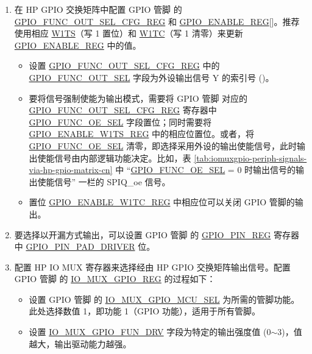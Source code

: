 \documentclass[main\_\_CN.tex]{subfiles}
\begin{document}
\begin{enumerate}
    \item 在 HP GPIO 交换矩阵中配置 GPIO 管脚  的 \hyperref[regdesc:GPIOFUNCNOUTSELCFGREG]{GPIO\_FUNC\_OUT\_SEL\_CFG\_REG} 和 \hyperref[regdesc:GPIOENABLEREG]{GPIO\_ENABLE\_REG}[]。推荐使用相应 \hyperref[regdesc:GPIOENABLEW1TSREG]{W1TS}（写 1 置位）和 \hyperref[regdesc:GPIOENABLEW1TCREG]{W1TC}（写 1 清零）来更新 \hyperref[regdesc:GPIOENABLEREG]{GPIO\_ENABLE\_REG} 中的值。


    \begin{itemize}
        \item 设置 \hyperref[regdesc:GPIOFUNCNOUTSELCFGREG]{GPIO\_FUNC\_OUT\_SEL\_CFG\_REG} 中的 \hyperref[fielddesc:GPIOFUNCNOUTSEL]{GPIO\_FUNC\_OUT\_SEL} 字段为外设输出信号 Y 的索引号 ()。
        \item 要将信号强制使能为输出模式，需要将 GPIO 管脚  对应的 \hyperref[regdesc:GPIOFUNCNOUTSELCFGREG]{GPIO\_FUNC\_OUT\_SEL\_CFG\_REG} 寄存器中 \hyperref[fielddesc:GPIOFUNCNOESEL]{GPIO\_FUNC\_OE\_SEL} 字段置位；同时需要将 \hyperref[regdesc:GPIOENABLEW1TSREG]{GPIO\_ENABLE\_W1TS\_REG} 中的相应位置位。或者，将 \hyperref[fielddesc:GPIOFUNCNOESEL]{GPIO\_FUNC\_OE\_SEL} 清零，即选择采用外设的输出使能信号，此时输出使能信号由内部逻辑功能决定。比如，表 \ref{tab:iomuxgpio-periph-signals-via-hp-gpio-matrix-cn} 中 “\hyperref[fielddesc:GPIOFUNCNOESEL]{GPIO\_FUNC\_OE\_SEL} = 0 时输出信号的输出使能信号” 一栏的 SPIQ\_oe 信号。
       \item 置位 \hyperref[regdesc:GPIOENABLEW1TCREG]{GPIO\_ENABLE\_W1TC\_REG} 中相应位可以关闭 GPIO 管脚的输出。
    \end{itemize}
    \item 要选择以开漏方式输出，可以设置 GPIO 管脚  的 \hyperref[regdesc:GPIOPINNREG]{GPIO\_PIN\_REG} 寄存器中 \hyperref[fielddesc:GPIOPINNPADDRIVER]{GPIO\_PIN\_PAD\_DRIVER} 位。
    \item 配置 HP IO MUX 寄存器来选择经由 HP GPIO 交换矩阵输出信号。配置 GPIO 管脚  的 \hyperref[regdesc:IOMUXGPIONREG]{IO\_MUX\_GPIO\_REG} 的过程如下：
    \begin{itemize}
        \item 设置 GPIO 管脚  的 \hyperref[fielddesc:IOMUXGPIONMCUSEL]{IO\_MUX\_GPIO\_MCU\_SEL} 为所需的管脚功能。此处选择数值 1，即功能 1（GPIO 功能），适用于所有管脚。
        \item 设置 \hyperref[fielddesc:IOMUXGPIONFUNDRV]{IO\_MUX\_GPIO\_FUN\_DRV} 字段为特定的输出强度值 (0$\sim$3)，值越大，输出驱动能力越强。

\end{itemize}
\end{enumerate}
\end{document}
